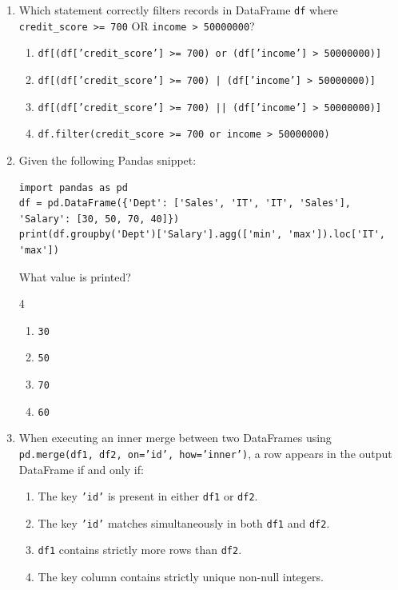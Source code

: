 \documentclass[11pt,a4paper]{article}
\begin{document}
\newpage
\begin{enumerate}[leftmargin=*,itemsep=2.5pt,resume]

\item Which statement correctly filters records in DataFrame \texttt{df} where \texttt{credit\_score >= 700} OR \texttt{income > 50000000}?
\begin{enumerate}[label=\Alph*.]
  \item \texttt{df[(df['credit\_score'] >= 700) or (df['income'] > 50000000)]}
  \item \texttt{df[(df['credit\_score'] >= 700) | (df['income'] > 50000000)]}
  \item \texttt{df[(df['credit\_score'] >= 700) || (df['income'] > 50000000)]}
  \item \texttt{df.filter(credit\_score >= 700 or income > 50000000)}
\end{enumerate}

\item Given the following Pandas snippet:
\begin{lstlisting}
import pandas as pd
df = pd.DataFrame({'Dept': ['Sales', 'IT', 'IT', 'Sales'], 'Salary': [30, 50, 70, 40]})
print(df.groupby('Dept')['Salary'].agg(['min', 'max']).loc['IT', 'max'])
\end{lstlisting}
What value is printed?
\begin{multicols}{4}
\begin{enumerate}[label=\Alph*.]
  \item \texttt{30}
  \item \texttt{50}
  \item \texttt{70}
  \item \texttt{60}
\end{enumerate}
\end{multicols}

\item When executing an inner merge between two DataFrames using \texttt{pd.merge(df1, df2, on='id', how='inner')}, a row appears in the output DataFrame if and only if:
\begin{enumerate}[label=\Alph*.]
  \item The key \texttt{'id'} is present in either \texttt{df1} or \texttt{df2}.
  \item The key \texttt{'id'} matches simultaneously in both \texttt{df1} and \texttt{df2}.
  \item \texttt{df1} contains strictly more rows than \texttt{df2}.
  \item The key column contains strictly unique non-null integers.
\end{enumerate}


\end{enumerate}
\end{document}
